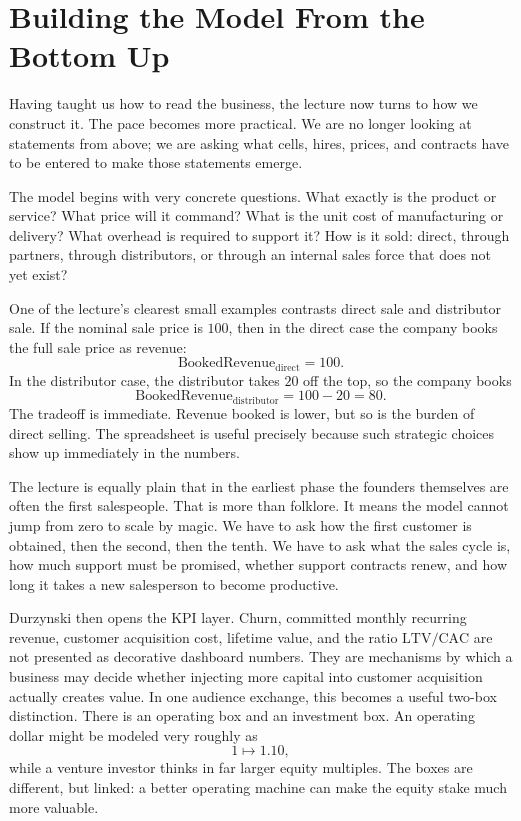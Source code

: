 \section{Building the Model From the Bottom Up}

Having taught us how to read the business, the lecture now turns to how we construct it. The pace becomes more practical. We are no longer looking at statements from above; we are asking what cells, hires, prices, and contracts have to be entered to make those statements emerge.

The model begins with very concrete questions. What exactly is the product or service? What price will it command? What is the unit cost of manufacturing or delivery? What overhead is required to support it? How is it sold: direct, through partners, through distributors, or through an internal sales force that does not yet exist?

One of the lecture's clearest small examples contrasts direct sale and distributor sale. If the nominal sale price is \(100\), then in the direct case the company books the full sale price as revenue:
\begin{equation}
\mathrm{BookedRevenue}_{\mathrm{direct}} = 100.
\end{equation}
In the distributor case, the distributor takes \(20\) off the top, so the company books
\begin{equation}
\mathrm{BookedRevenue}_{\mathrm{distributor}} = 100 - 20 = 80.
\end{equation}
The tradeoff is immediate. Revenue booked is lower, but so is the burden of direct selling. The spreadsheet is useful precisely because such strategic choices show up immediately in the numbers.

The lecture is equally plain that in the earliest phase the founders themselves are often the first salespeople. That is more than folklore. It means the model cannot jump from zero to scale by magic. We have to ask how the first customer is obtained, then the second, then the tenth. We have to ask what the sales cycle is, how much support must be promised, whether support contracts renew, and how long it takes a new salesperson to become productive.

Durzynski then opens the KPI layer. Churn, committed monthly recurring revenue, customer acquisition cost, lifetime value, and the ratio \(\mathrm{LTV}/\mathrm{CAC}\) are not presented as decorative dashboard numbers. They are mechanisms by which a business may decide whether injecting more capital into customer acquisition actually creates value. In one audience exchange, this becomes a useful two-box distinction. There is an operating box and an investment box. An operating dollar might be modeled very roughly as
\begin{equation}
1 \mapsto 1.10,
\end{equation}
while a venture investor thinks in far larger equity multiples. The boxes are different, but linked: a better operating machine can make the equity stake much more valuable.

